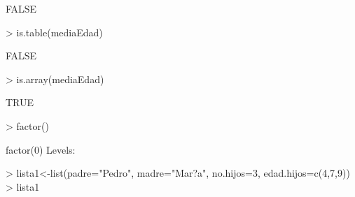 \documentclass{article}
\begin{document}
\begin{Schunk}
\begin{Soutput}
[1] FALSE
\end{Soutput}
\begin{Sinput}
> is.table(mediaEdad)
\end{Sinput}
\begin{Soutput}
[1] FALSE
\end{Soutput}
\begin{Sinput}
> is.array(mediaEdad)
\end{Sinput}
\begin{Soutput}
[1] TRUE
\end{Soutput}
\begin{Sinput}
> factor()
\end{Sinput}
\begin{Soutput}
factor(0)
Levels: 
\end{Soutput}
\begin{Sinput}
> lista1<-list(padre="Pedro", madre="Mar?a", no.hijos=3, edad.hijos=c(4,7,9))
> lista1
\end{Sinput}
\end{Schunk}
\end{document}
